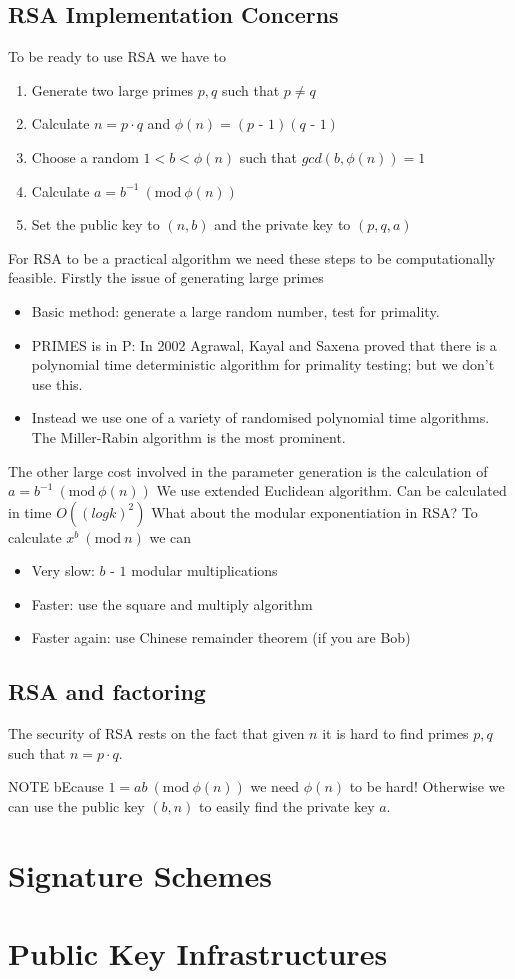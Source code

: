 \documentclass{article}
\theoremstyle{quest}
\newcommand{\mns}{\textrm{ -  }}
\newcommand{\Mod}[1]{\ (\mathrm{mod}\ #1)}
\begin{document}
\subsection{RSA Implementation Concerns}
To be ready to use RSA we have to
\begin{enumerate}
    \item Generate two large primes $p, q$ such that $p \neq q$
    \item Calculate $n = p \cdot q$ and $\phi(n) = (p \mns 1) (q \mns 1)$
    \item Choose a random $1 < b < \phi(n)$ such that $gcd(b, \phi(n)) = 1$
    \item Calculate $a = b^{-1} \Mod{\phi(n)}$
    \item Set the public key to $(n, b)$ and the private key to $(p, q, a)$
\end{enumerate}
For RSA to be a practical algorithm we need these steps to be computationally feasible.
Firstly the issue of generating large primes
\begin{itemize}
    \item Basic method: generate a large random number, test for primality.
    \item PRIMES is in P: In 2002 Agrawal, Kayal and Saxena proved that
        there is a polynomial time deterministic algorithm for primality testing; but we don’t use this.
    \item Instead we use one of a variety of randomised polynomial time algorithms. The Miller-Rabin algorithm is the most prominent.
\end{itemize}

The other large cost involved in the parameter generation is the calculation of
$a = b^{-1} \Mod{\phi(n)}$
We use extended Euclidean algorithm.
Can be calculated in time $O((log k)^2)$
What about the modular exponentiation in RSA?
To calculate $x^b \Mod{n}$ we can
\begin{itemize}
    \item Very slow: $b \mns 1$ modular multiplications
    \item Faster: use the square and multiply algorithm
    \item Faster again: use Chinese remainder theorem (if you are Bob)
\end{itemize}

\subsection{RSA and factoring}
The security of RSA rests on the fact that given $n$
it is hard to find primes $p,q$ such that $n = p \cdot q$.

NOTE bEcause $1 = ab \Mod{\phi(n)}$ we need $\phi(n)$ to be hard!
Otherwise we can use the public key $(b,n)$ to easily find the private key $a$.



\section{Signature Schemes}
\section{Public Key Infrastructures}
\end{document}
